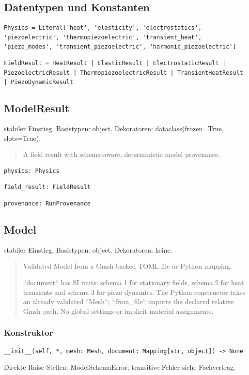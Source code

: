 \subsection*{Datentypen und Konstanten}
\begin{lstlisting}
Physics = Literal['heat', 'elasticity', 'electrostatics', 'piezoelectric', 'thermopiezoelectric', 'transient_heat', 'piezo_modes', 'transient_piezoelectric', 'harmonic_piezoelectric']
\end{lstlisting}
\begin{lstlisting}
FieldResult = HeatResult | ElasticResult | ElectrostaticResult | PiezoelectricResult | ThermopiezoelectricResult | TransientHeatResult | PiezoDynamicResult
\end{lstlisting}
\subsection{ModelResult}
stabiler Einstieg.
Basistypen: object. Dekoratoren: dataclass(frozen=True, slots=True).
\begin{quote}
A field result with schema-aware, deterministic model provenance.
\end{quote}
\begin{lstlisting}
physics: Physics
\end{lstlisting}
\begin{lstlisting}
field_result: FieldResult
\end{lstlisting}
\begin{lstlisting}
provenance: RunProvenance
\end{lstlisting}
\subsection{Model}
stabiler Einstieg.
Basistypen: object. Dekoratoren: keine.
\begin{quote}
Validated Model from a Gmsh-backed TOML file or Python mapping.\par ``document`` has SI units: schema 1 for stationary fields, schema 2 for heat transients and schema 3 for piezo dynamics. The Python constructor takes an already validated ``Mesh``; ``from\_file`` imports the declared relative Gmsh path. No global settings or implicit material assignments.
\end{quote}
\subsubsection*{Konstruktor}
\begin{lstlisting}
__init__(self, *, mesh: Mesh, document: Mapping[str, object]) -> None
\end{lstlisting}
Direkte Raise-Stellen: ModelSchemaError; transitive Fehler siehe Fachvertrag.
